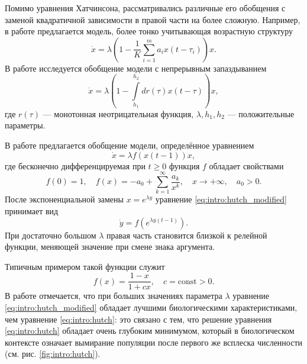 Помимо уравнения Хатчинсона, рассматривались различные его обобщения с заменой квадратичной зависимости в правой части на более сложную. Например, в работе \cite{Glyzin2007} предлагается модель, более тонко учитывающая возрастную структуру
\begin{equation}
	\dot{x}=\lambda \left(1 - \frac{1}{K}\sum\limits_{i = 1}^{m} a_i x(t-\tau_i)\right) x.
\end{equation}
%
В работе \cite{Kaschenko2012} исследуется обобщение модели с непрерывным запаздыванием
\begin{equation}
	\dot{x} = \lambda \left(1 - \int\limits_{h_1}^{h_2}dr(\tau)x(t - \tau)\right) x,
\end{equation}
где $r(\tau)$ --- монотонная неотрицательная функция, $\lambda, h_1, h_2$ --- положительные параметры.

В работе \cite{Kolesov2010} предлагается обобщение модели, определённое уравнением
\begin{equation}
\label{eq:intro:hutch_modified}
	\dot{x} = \lambda f(x(t - 1)) x,
\end{equation}
%
где бесконечно дифференцируемая при $t \geq 0$ функция $f$ обладает свойствами
\[
f(0) = 1, \quad f(x) = -a_0 + \sum\limits_{k = 1}^{\infty} \frac{a_k}{x^k}, \quad x \to +\infty, \quad a_0 > 0.
\]
После экспоненциальной замены $x = e^{\lambda y}$ уравнение \eqref{eq:intro:hutch_modified} принимает вид
\begin{equation}
\label{eq:intro:hutch_modified_exp}
\dot{y} = f(e^{\lambda y(t - 1)}).
\end{equation}
При достаточно большом $\lambda$ правая часть становится близкой к релейной функции, меняющей значение при смене знака аргумента.

Типичным примером такой функции служит
\[
f(x) = \dfrac{1 - x}{1 + cx}, \quad c = \text{const} > 0.
\]
В работе \cite{Kolesov2010} отмечается, что при больших значениях параметра $\lambda$ уравнение \eqref{eq:intro:hutch_modified} обладает лучшими биологическими характеристиками, чем уравнение \eqref{eq:intro:hutch}: это связано с тем, что решение уравнения \eqref{eq:intro:hutch} обладает очень глубоким минимумом, который в биологическом контексте означает вымирание популяции после первого же всплеска численности (см. рис. \ref{fig:intro:hutch}).


